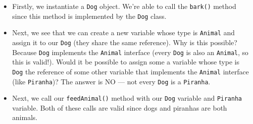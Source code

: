 \begin{itemize}
    \item Firstly, we instantiate a \verb!Dog! object. We're able to call the \verb!bark()! method since this method is implemented by the \verb!Dog! class.
    \item Next, we see that we can create a new variable whose type is \verb!Animal! and assign it to our \verb!Dog! (they share the same reference). Why is this possible? Because \verb!Dog! implements the \verb!Animal! interface (every \verb!Dog! is also an \verb!Animal!, so this is valid!). Would it be possible to assign some a variable whose type is \verb!Dog! the reference of some other variable that implements the \verb!Animal! interface (like \verb!Piranha!)? The answer is NO --- not every \verb!Dog! is a \verb!Piranha!.
    \item Next, we call our \verb!feedAnimal()! method with our \verb!Dog! variable and \verb!Piranha! variable. Both of these calls are valid since dogs and piranhas are both animals.
\end{itemize}